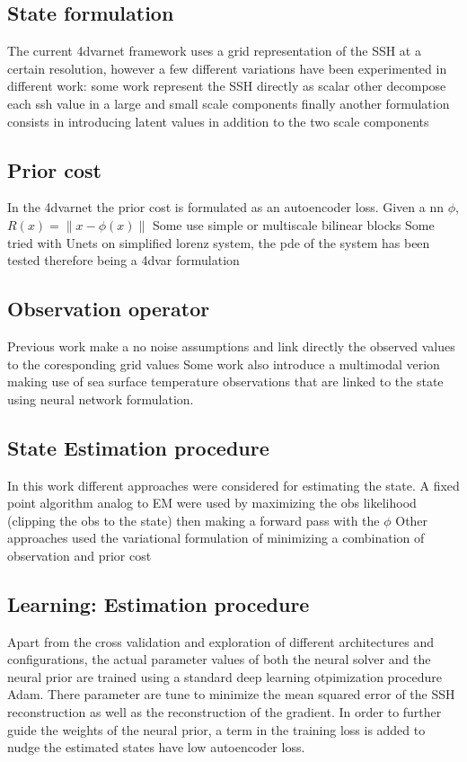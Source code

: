 \begin{bibunit}
\subsection{State formulation}
The current 4dvarnet framework uses a grid representation of the SSH at a certain resolution, however a few different variations have been experimented in different work:
some work represent the SSH directly as scalar
other decompose each ssh value in a large and small scale components
finally another formulation consists in introducing latent values in addition to the two scale components 


\subsection{Prior cost}
In the 4dvarnet the prior cost is formulated as an autoencoder loss.
Given a nn $\phi$, $R(x)=\|x - \phi(x)\|$
Some use simple or multiscale bilinear blocks
Some tried with Unets
on simplified lorenz system, the pde of the system has been tested therefore being a 4dvar formulation



\subsection{Observation operator}
Previous work make a no noise assumptions and link directly the observed values to the coresponding grid values
Some work also introduce a multimodal verion making use of sea surface temperature observations that are linked to the state using neural network formulation.


\subsection{State Estimation procedure}
In this work different approaches were considered for  estimating the state.
A fixed point algorithm analog to EM were used by maximizing the obs likelihood (clipping the obs to the state) then making a forward pass with the $\phi$
Other approaches used the variational formulation of minimizing a combination of observation and prior cost


\subsection{Learning: Estimation procedure}
Apart from the cross validation and exploration of different architectures and configurations, the actual parameter values of both the neural solver and the neural prior are trained using a standard deep learning otpimization procedure Adam. There parameter are tune to minimize the mean squared error of the SSH reconstruction as well as  the reconstruction of the gradient. In order to further guide the weights of the neural prior, a term in the training loss is added to nudge the estimated states have low autoencoder loss.


\end{bibunit}

